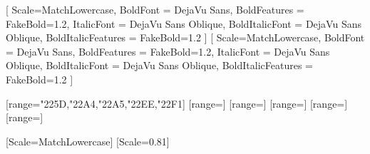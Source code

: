 
%

\usepackage{fontspec}
\setmainfont{DejaVu Sans}[
	Scale=MatchLowercase,
	BoldFont = DejaVu Sans,
	BoldFeatures = {FakeBold=1.2},
	ItalicFont = DejaVu Sans Oblique,
	BoldItalicFont = DejaVu Sans Oblique,
	BoldItalicFeatures = {FakeBold=1.2}
]
\setsansfont{DejaVu Sans}[
	Scale=MatchLowercase,
	BoldFont = DejaVu Sans,
	BoldFeatures = {FakeBold=1.2},
	ItalicFont = DejaVu Sans Oblique,
	BoldItalicFont = DejaVu Sans Oblique,
	BoldItalicFeatures = {FakeBold=1.2}
]
\renewcommand{\familydefault}{\sfdefault} %



\usepackage{amsmath, amssymb, amsthm}
\usepackage{amsfonts}
\usepackage{mathtools}
\usepackage{unicode-math}
\usepackage{mathrsfs}
[range={"225D,"22A4,"22A5,"22EE,"22F1}]
[range=\mathcal]
[range=\symcal]
[range=\mathfrak]
[range=\symfrak]
[range=\Im]

\setmonofont[
	Scale=0.9,
	BoldFont = * Bold,
	ItalicFont = * Italic,
	BoldItalicFont = * Bold Italic
]{JetBrains Mono}

\newfontfamily{}[Scale=MatchLowercase]
\newfontfamily{}[Scale=0.81]

\makeatletter
\def\bfseries@sf{medium}
\def\mdseries@sf{m}
\makeatother

